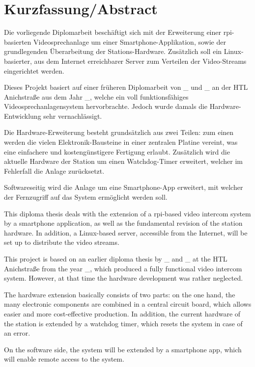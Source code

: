 \documentclass[a4paper, 12pt, twoside, openright
]{memoir}
\begin{document}
\chapter{Kurzfassung/Abstract}
\thispagestyle{abstractpage}
Die vorliegende Diplomarbeit beschäftigt sich mit der Erweiterung einer \ac{rpi}-basierten Videosprechanlage um einer Smartphone-Applikation, sowie der grundlegenden Überarbeitung der Stations-Hardware.
Zusätzlich soll ein Linux-basierter, aus dem Internet erreichbarer Server zum Verteilen der Video-Streams eingerichtet werden.
\par
Dieses Projekt basiert auf einer früheren Diplomarbeit von \_ und \_ an der HTL Anichstraße aus dem Jahr \_, welche ein voll funktionsfähiges Videosprechanlagensystem hervorbrachte.
Jedoch wurde damals die Hardware-Entwicklung sehr vernachlässigt.
\par
Die Hardware-Erweiterung besteht grundsätzlich aus zwei Teilen: zum einen werden die vielen Elektronik-Bausteine in einer zentralen Platine vereint, was eine einfachere und kostengünstigere Fertigung erlaubt.
Zusätzlich wird die aktuelle Hardware der Station um einen Watchdog-Timer erweitert, welcher im Fehlerfall die Anlage zurücksetzt.
\par
Softwareseitig wird die Anlage um eine Smartphone-App erweitert, mit welcher der Fernzugriff auf das System ermöglicht werden soll.
\par

\vspace*{1cm}
\begin{otherlanguage}{british}
	This diploma thesis deals with the extension of a \ac{rpi}-based video intercom system by a smartphone application, as well as the fundamental revision of the station hardware.
	In addition, a Linux-based server, accessible from the Internet, will be set up to distribute the video streams.
	\par
	This project is based on an earlier diploma thesis by \_ and \_ at the HTL Anichstraße from the year \_, which produced a fully functional video intercom system.
	However, at that time the hardware development was rather neglected.
	\par
	The hardware extension basically consists of two parts: on the one hand, the many electronic components are combined in a central circuit board, which allows easier and more cost-effective production.
	In addition, the current hardware of the station is extended by a watchdog timer, which resets the system in case of an error.
	\par
	On the software side, the system will be extended by a smartphone app, which will enable remote access to the system.
	\par
\end{otherlanguage}
\end{document}
